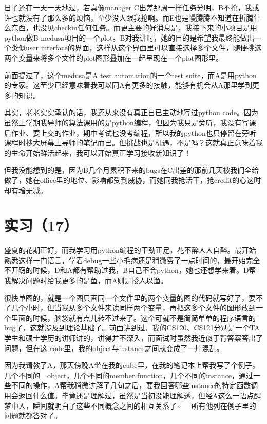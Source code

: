 \documentclass[12pt]{book}
\begin{document}
日子还在一天一天地过，若真像manager C出差那周一样任务分明，B不抢，我或许也就没有了那么多的烦恼，至少没人跟我抢啊。而E也是慢腾腾不知道在折腾什么东西，也没见checkin任何任务。而更主要的好消息是，我接下来的小项目是用python做B medusa项目的一个plot。B对我讲时，她的目的是希望我最终能做出一个类似user interface的界面，这样从这个界面里可以直接选择多个文件，随便挑选两个变量来将多个文件的plot图形叠加在一起呈现在一个plot图形里。

前面提过了，这个medusa是A test automation的一个test suite，而A是用python的专家。这至少已经意味着我可以同A有更多的接触，能够有机会从A那里学到更多的知识。

其实，老老实实承认的话，我还从来没有真正自已主动地写过python code。因为虽然上学期我导师的算法课用的是python编程，但因为我只是旁听，我没有写课后作业、要上交的作业，期中考试也没考编程，所以我的python也只停留在旁听课程时抄大屏幕上导师的笔记而已。但挑战也是机遇，不是吗？这就真正意味着我的生命开始鲜活起来，我可以开始真正学习接收新知识了！

但我没能想到的是，因为B几个月累积下来的bugs在C出差的那前几天被我们全给做了，她在office里的地位、影响都受到威协，而她同我抢活干，抢credit的心这时却有增无减。

\section{实习（17）}
\label{sec-5-20}

盛夏的花期正好，而我学习用python编程的干劲正足，花不醉人人自醉。最开始熟悉这样一门语言，学着debug一些小毛病还是稍微费了一点时间的，最开始完全不开窃的时候，D和A都有帮助过我，B自己不会python，她也还想学来着。D帮我解决问题时给我更多的是鱼，而A则是授人以渔。

很快单图的，就是一个图只画同一个文件里的两个变量的图的代码就写好了，要不了几个小时，但当我从多个文件来读同样两个变量，再把这多个文件的图形放到一个里面的时候，脑袋就有点儿转不过来了。这个可就不是简简单单的程序语言的bug了，这就涉及到理论基础了。前面讲到过，我的CS120、CS121分别是一个TA学生和硕士学历的讲师讲的，讲得并不深入，而面试时虽然我近似于背答案答出了问题，但在这 code里，我的object与instance之间就变成了一片混乱。

因为我请教了A，那天傍晚A坐在我的cube里，在我的笔记本上帮我写了个例子。几个不同的　object，几个不同的member function，几个不同的instance，通过一些不同的操作，A帮我稍微讲解了几句之后，要我回答哪些instance的特定函数调用会返回什么值。毕竟还是理解过，虽然是当初没能理解透，但经A这么一语点醒梦中人，瞬间就明白了这些不同概念之间的相互关系了\textasciitilde{}~　所有他列在例子里的问题就都答对了。
\end{document}
